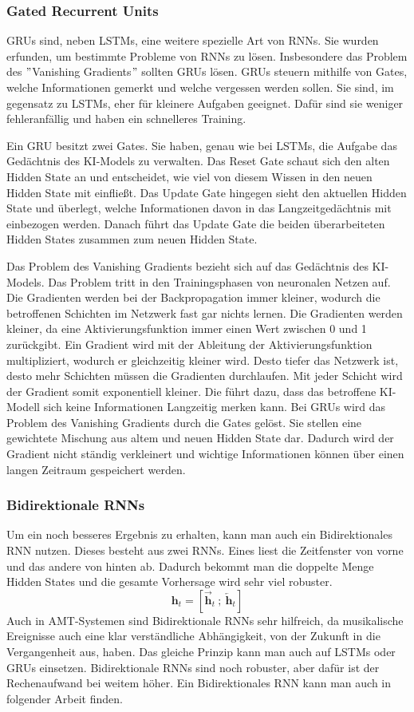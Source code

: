 \subsubsection{Gated Recurrent Units}
GRUs sind, neben LSTMs, eine weitere spezielle Art von RNNs.
\cite{chung2014empirical}
Sie wurden erfunden, um bestimmte Probleme von RNNs zu lösen.
Insbesondere das Problem des \("\)Vanishing Gradients\("\) sollten GRUs lösen.
GRUs steuern mithilfe von Gates, welche Informationen gemerkt und welche vergessen werden sollen.
Sie sind, im gegensatz zu LSTMs, eher für kleinere Aufgaben geeignet.
Dafür sind sie weniger fehleranfällig und haben ein schnelleres Training.

Ein GRU besitzt zwei Gates.
Sie haben, genau wie bei LSTMs, die Aufgabe das Gedächtnis des KI-Models zu verwalten.
Das Reset Gate schaut sich den alten Hidden State an und entscheidet,
wie viel von diesem Wissen in den neuen Hidden State mit einfließt.
Das Update Gate hingegen sieht den aktuellen Hidden State und überlegt,
welche Informationen davon in das Langzeitgedächtnis mit einbezogen werden.
Danach führt das Update Gate die beiden überarbeiteten Hidden States zusammen zum neuen Hidden State.

Das Problem des Vanishing Gradients bezieht sich auf das Gedächtnis des KI-Models.
Das Problem tritt in den Trainingsphasen von neuronalen Netzen auf.
Die Gradienten werden bei der Backpropagation immer kleiner,
wodurch die betroffenen Schichten im Netzwerk fast gar nichts lernen.
Die Gradienten werden kleiner, da eine Aktivierungsfunktion immer einen Wert zwischen 0 und 1 zurückgibt.
Ein Gradient wird mit der Ableitung der Aktivierungsfunktion multipliziert, wodurch er gleichzeitig kleiner wird.
Desto tiefer das Netzwerk ist, desto mehr Schichten müssen die Gradienten durchlaufen.
Mit jeder Schicht wird der Gradient somit exponentiell kleiner.
Die führt dazu, dass das betroffene KI-Modell sich keine Informationen Langzeitig merken kann.
Bei GRUs wird das Problem des Vanishing Gradients durch die Gates gelöst.
Sie stellen eine gewichtete Mischung aus altem und neuen Hidden State dar.
Dadurch wird der Gradient nicht ständig verkleinert
und wichtige Informationen können über einen langen Zeitraum gespeichert werden.

\subsubsection{Bidirektionale RNNs}
Um ein noch besseres Ergebnis zu erhalten, kann man auch ein Bidirektionales RNN nutzen.
Dieses besteht aus zwei RNNs.
Eines liest die Zeitfenster von vorne und das andere von hinten ab.
Dadurch bekommt man die doppelte Menge Hidden States und die gesamte Vorhersage wird sehr viel robuster.
\[
\mathbf{h}_t = \left[ \overrightarrow{\mathbf{h}}_t \ ;\ \overleftarrow{\mathbf{h}}_t \right]
\]
Auch in AMT-Systemen sind Bidirektionale RNNs sehr hilfreich,
da musikalische Ereignisse auch eine klar verständliche Abhängigkeit, von der Zukunft in die Vergangenheit aus, haben.
Das gleiche Prinzip kann man auch auf LSTMs oder GRUs einsetzen.
Bidirektionale RNNs sind noch robuster, aber dafür ist der Rechenaufwand bei weitem höher.
Ein Bidirektionales RNN kann man auch in folgender Arbeit finden.
\cite{hawthorne2017onsets}

